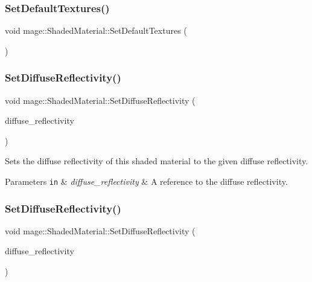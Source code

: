 \subsubsection{\texorpdfstring{Set\+Default\+Textures()}{SetDefaultTextures()}}
{\footnotesize\ttfamily void mage\+::\+Shaded\+Material\+::\+Set\+Default\+Textures (\begin{DoxyParamCaption}{ }\end{DoxyParamCaption})\hspace{0.3cm}{\ttfamily [private]}}

\hypertarget{structmage_1_1_shaded_material_a2da4b314ab2f92659cbed167cc1f32c9}{}\label{structmage_1_1_shaded_material_a2da4b314ab2f92659cbed167cc1f32c9} 
\subsubsection{\texorpdfstring{Set\+Diffuse\+Reflectivity()}{SetDiffuseReflectivity()}\hspace{0.1cm}{\footnotesize\ttfamily [1/2]}}
{\footnotesize\ttfamily void mage\+::\+Shaded\+Material\+::\+Set\+Diffuse\+Reflectivity (\begin{DoxyParamCaption}\item[{const \hyperlink{structmage_1_1_r_g_b_spectrum}{R\+G\+B\+Spectrum} \&}]{diffuse\+\_\+reflectivity }\end{DoxyParamCaption})\hspace{0.3cm}{\ttfamily [noexcept]}}

Sets the diffuse reflectivity of this shaded material to the given diffuse reflectivity.


\begin{DoxyParams}[1]{Parameters}
\mbox{\tt in}  & {\em diffuse\+\_\+reflectivity} & A reference to the diffuse reflectivity. \\
\hline
\end{DoxyParams}
\hypertarget{structmage_1_1_shaded_material_a672e0afafbad1280c97d2ad909b320c8}{}\label{structmage_1_1_shaded_material_a672e0afafbad1280c97d2ad909b320c8} 
\subsubsection{\texorpdfstring{Set\+Diffuse\+Reflectivity()}{SetDiffuseReflectivity()}\hspace{0.1cm}{\footnotesize\ttfamily [2/2]}}
{\footnotesize\ttfamily void mage\+::\+Shaded\+Material\+::\+Set\+Diffuse\+Reflectivity (\begin{DoxyParamCaption}\item[{\hyperlink{structmage_1_1_r_g_b_spectrum}{R\+G\+B\+Spectrum} \&\&}]{diffuse\+\_\+reflectivity }\end{DoxyParamCaption})\hspace{0.3cm}{\ttfamily [noexcept]}}

